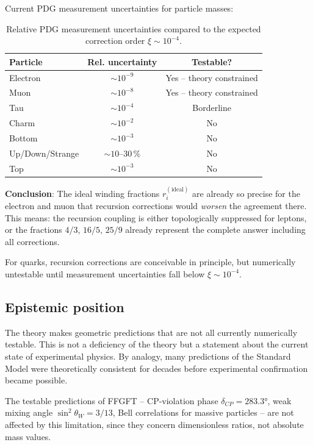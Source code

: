 Current PDG measurement uncertainties for particle masses:

\begin{table}[htbp]
\centering
\begin{tabular}{lcc}
\toprule
\textbf{Particle} & \textbf{Rel. uncertainty} & \textbf{Testable?} \\
\midrule
Electron & $\sim 10^{-9}$ & Yes -- theory constrained \\
Muon     & $\sim 10^{-8}$ & Yes -- theory constrained \\
Tau      & $\sim 10^{-4}$ & Borderline \\
Charm    & $\sim 10^{-2}$ & No \\
Bottom   & $\sim 10^{-3}$ & No \\
Up/Down/Strange & $\sim 10\text{--}30\,\%$ & No \\
Top      & $\sim 10^{-3}$ & No \\
\bottomrule
\end{tabular}
\caption{Relative PDG measurement uncertainties compared to the expected
correction order $\xi \sim 10^{-4}$.}
\label{tab:precision}
\end{table}

\textbf{Conclusion}: The ideal winding fractions $r_i^{(\mathrm{ideal})}$
are already so precise for the electron and muon that recursion corrections
would \emph{worsen} the agreement there. This means: the recursion coupling
is either topologically suppressed for leptons, or the fractions $4/3$,
$16/5$, $25/9$ already represent the complete answer including all corrections.

For quarks, recursion corrections are conceivable in principle, but
numerically untestable until measurement uncertainties fall below
$\xi \sim 10^{-4}$.

\subsection{Epistemic position}

The theory makes geometric predictions that are not all currently
numerically testable. This is not a deficiency of the theory but a
statement about the current state of experimental physics. By analogy,
many predictions of the Standard Model were theoretically consistent
for decades before experimental confirmation became possible.

The testable predictions of FFGFT -- CP-violation phase
$\delta_{CP} = 283.3°$, weak mixing angle $\sin^2\theta_W = 3/13$,
Bell correlations for massive particles -- are not affected by this
limitation, since they concern dimensionless ratios, not absolute
mass values.


